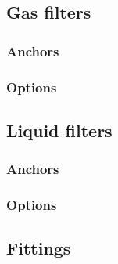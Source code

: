\documentclass[a4paper, twoside]{article}
\begin{document}
    \subsection{Gas filters}
        \subsubsection{Anchors}
            

        \subsubsection{Options}
            
    
    \subsection{Liquid filters}
        \subsubsection{Anchors}
            

        \subsubsection{Options}
            
        
    \subsection{Fittings}
        

    
\end{document}
